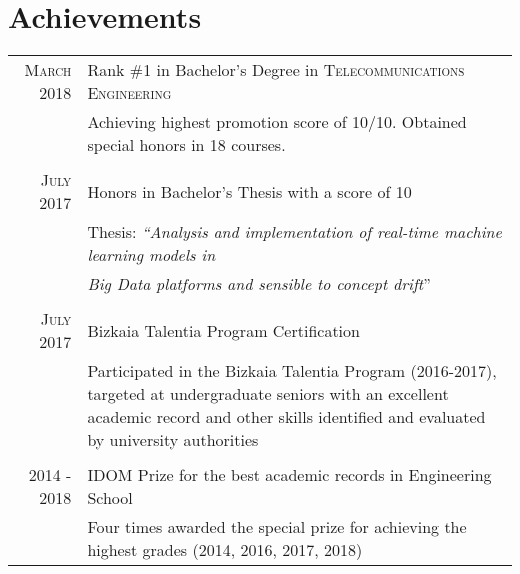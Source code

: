\documentclass[a4paper,10pt]{article}
\begin{document}

\section{Achievements}
\begin{tabular}{rp{13.6cm}}
\textsc{March} 2018 & Rank \#1 in Bachelor's Degree in \textsc{Telecommunications Engineering} \\%
&\footnotesize{Achieving highest promotion score of 10/10. Obtained special honors in 18 courses.} \\&\\

\textsc{July} 2017 & Honors in Bachelor's Thesis with a score of 10 \\%
& \footnotesize{Thesis: \emph{``Analysis and implementation of real-time machine learning models in}} \\
& \footnotesize{ \hspace{10mm}\emph{ Big Data platforms and sensible to concept drift}'' }\\&\\

\textsc{July} 2017 & Bizkaia Talentia Program Certification \\%
& \footnotesize{Participated in the Bizkaia Talentia Program (2016-2017), targeted at undergraduate seniors with an excellent \newline academic record and other skills identified and evaluated by university authorities} \\&\\

2014 - 2018 & IDOM Prize for the best academic records in Engineering School\\%
&\footnotesize{ Four times awarded the special prize for achieving the highest grades (2014, 2016, 2017, 2018)} \\
\end{tabular}
\end{document}
